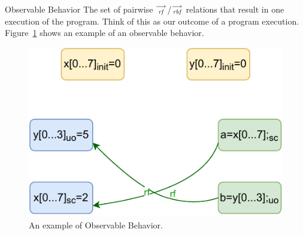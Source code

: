     \begin{definition}{Observable Behavior}
        The set of pairwise $\stackrel{\longrightarrow}{_\textit{rf}}$/$\stackrel{\longrightarrow}{_\textit{rbf}}$ relations that result in one execution of the program. 
        Think of this as our outcome of a program execution.
        Figure~\ref{model:observable} shows an example of an observable behavior.
        \begin{figure}[H]
            \centering
            \includegraphics[scale=0.7]{3.ECMAScriptMemoryModel/Observables.pdf}
            \caption{An example of Observable Behavior.}
            \label{model:observable}
        \end{figure}
        
    \end{definition}

    
